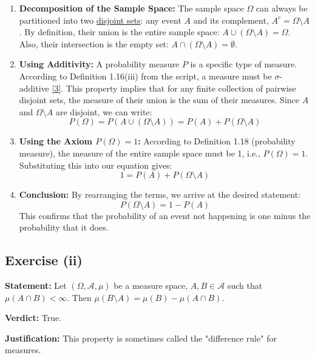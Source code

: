 \documentclass[11pt,a4paper]{article}
\begin{document}
\begin{enumerate}
    \item \textbf{Decomposition of the Sample Space:} The sample space $\Omega$ can always be partitioned into two \hyperlink{note4}{disjoint sets}: any event $A$ and its complement, $A^c = \Omega \setminus A$. By definition, their union is the entire sample space: $A \cup (\Omega \setminus A) = \Omega$. Also, their intersection is the empty set: $A \cap (\Omega \setminus A) = \emptyset$.

    \item \textbf{Using Additivity:} A probability measure $P$ is a specific type of measure. According to Definition 1.16(iii) from the script, a measure must be $\sigma$-additive \hyperlink{note3}{[3]}. This property implies that for any finite collection of pairwise disjoint sets, the measure of their union is the sum of their measures. Since $A$ and $\Omega \setminus A$ are disjoint, we can write:
    \[
        P(\Omega) = P(A \cup (\Omega \setminus A)) = P(A) + P(\Omega \setminus A)
    \]

    \item \textbf{Using the Axiom $P(\Omega) = 1$:} According to Definition 1.18 (probability measure), the measure of the entire sample space must be 1, i.e., $P(\Omega) = 1$. Substituting this into our equation gives:
    \[
        1 = P(A) + P(\Omega \setminus A)
    \]

    \item \textbf{Conclusion:} By rearranging the terms, we arrive at the desired statement:
    \[
        P(\Omega \setminus A) = 1 - P(A)
    \]
    This confirms that the probability of an event not happening is one minus the probability that it does.
\end{enumerate}

\subsection*{Exercise (ii)}
\textbf{Statement:} Let $(\Omega, \mathcal{A}, \mu)$ be a measure space, $A, B \in \mathcal{A}$ such that $\mu(A \cap B) < \infty$. Then $\mu(B \setminus A) = \mu(B) - \mu(A \cap B)$.

\vspace{1em}

\textbf{Verdict:} True.

\textbf{Justification:}
This property is sometimes called the "difference rule" for measures.
\end{document}
